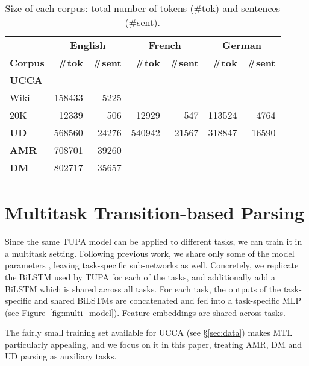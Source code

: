 \documentclass[11pt,a4paper]{article}
\begin{document}
\begin{table}[ht]
\centering
\small
\setlength\tabcolsep{3pt}
\begin{tabular}{l|rr|rr|rr}
& \multicolumn{2}{c|}{\footnotesize \bf English} & \multicolumn{2}{c|}{\footnotesize \bf French} & \multicolumn{2}{c}{\footnotesize \bf German} \\
\footnotesize \bf Corpus & \footnotesize \bf {\#}tok & \footnotesize \bf {\#}sent & \footnotesize \bf {\#}tok & \footnotesize \bf {\#}sent & \footnotesize \bf {\#}tok & \footnotesize \bf {\#}sent \\
\hline
\textbf{UCCA} &&&& \\
Wiki & 158433 & 5225 &&&& \\
20K & 12339 & 506 & 12929 & 547 & 113524 & 4764 \\
\hline
\textbf{UD} & 568560 & 24276 & 540942 & 21567 & 318847 & 16590 \\
\hline
\textbf{AMR} & 708701 & 39260 \\
\hline
\textbf{DM} & 802717 & 35657 \\
\end{tabular}
\caption{Size of each corpus: total number of tokens ({\#}tok) and sentences ({\#}sent).
\label{tab:corpora}}
\end{table}


\section{Multitask Transition-based Parsing}\label{sec:multitask}

Since the same TUPA model can be applied to different tasks, 
we can train it in a multitask setting.
Following previous work, we share only some of the model parameters
\cite{N16-1179,P16-2038,C16-1013,C16-1059,C16-1179,E17-1005,P17-1186}, leaving task-specific
sub-networks as well.
Concretely, we replicate the BiLSTM used by TUPA for each of the tasks, and additionally add
a BiLSTM which is shared across all tasks. 
For each task, the outputs of the task-specific and shared BiLSTMs are concatenated and
fed into a task-specific MLP (see Figure~\ref{fig:multi_model}).
Feature embeddings are shared across tasks.

The fairly small training set available for UCCA (see \S\ref{sec:data})
makes MTL particularly appealing,
and we focus on it in this paper, treating AMR, DM and UD parsing as auxiliary tasks.
\end{document}
